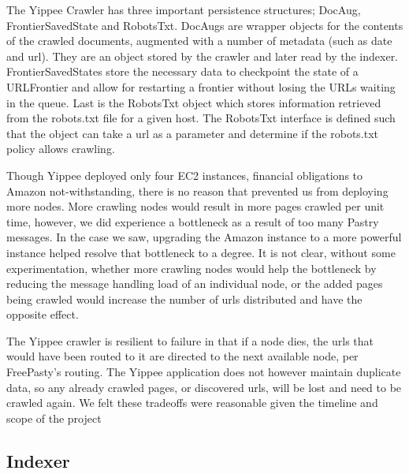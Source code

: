 \documentclass[11pt, letterpaper, oneside, twocolumn]{article}
\begin{document}
The Yippee Crawler has three important persistence structures; DocAug, FrontierSavedState and RobotsTxt.
DocAugs are wrapper objects for the contents of the crawled documents, augmented with a number of metadata (such as date and url).
They are an object stored by the crawler and later read by the indexer.
FrontierSavedStates store the necessary data to checkpoint the state of a URLFrontier and allow for restarting a frontier without losing the URLs waiting in the queue.
Last is the RobotsTxt object which stores information retrieved from the robots.txt file for a given host.
The RobotsTxt interface is defined such that the object can take a url as a parameter and determine if the robots.txt policy allows crawling.

Though Yippee deployed only four EC2 instances, financial obligations to Amazon not-withstanding, there is no reason that prevented us from deploying more nodes.
More crawling nodes would result in more pages crawled per unit time, however, we did experience a bottleneck as a result of too many Pastry messages.
In the case we saw, upgrading the Amazon instance to a more powerful instance helped resolve that bottleneck to a degree.
It is not clear, without some experimentation, whether more crawling nodes would help the bottleneck by reducing the message handling load of an individual node, or the added pages being crawled would increase the number of urls distributed and have the opposite effect.

The Yippee crawler is resilient to failure in that if a node dies, the urls that would have been routed to it are directed to the next available node, per FreePasty's routing.
The Yippee application does not however maintain duplicate data, so any already crawled pages, or discovered urls, will be lost and need to be crawled again.
We felt these tradeoffs were reasonable given the timeline and scope of the project

\subsection{Indexer}
\end{document}
